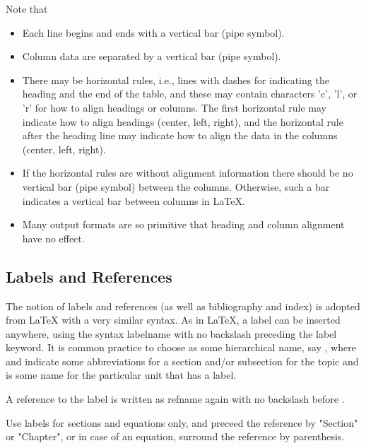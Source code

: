 \documentclass[%
oneside,                 %
final,                   %
10pt]{article}
\begin{document}
Note that

\begin{itemize}
 \item Each line begins and ends with a vertical bar (pipe symbol).

 \item Column data are separated by a vertical bar (pipe symbol).

 \item There may be horizontal rules, i.e., lines with dashes for
   indicating the heading and the end of the table, and these may
   contain characters 'c', 'l', or 'r' for how to align headings or
   columns. The first horizontal rule may indicate how to align
   headings (center, left, right), and the horizontal rule after the
   heading line may indicate how to align the data in the columns
   (center, left, right).

 \item If the horizontal rules are without alignment information there should
   be no vertical bar (pipe symbol) between the columns. Otherwise, such
   a bar indicates a vertical bar between columns in {\LaTeX}.

 \item Many output formats are so primitive that heading and column alignment
   have no effect.
\end{itemize}

\noindent
\subsection{Labels and References}

The notion of labels and references (as well as bibliography and index)
is adopted
from {\LaTeX} with a very similar syntax. As in {\LaTeX}, a label can be
inserted anywhere, using the syntax
\bccq
label{name}
\eccq
with no backslash
preceding the label keyword. It is common practice to choose 
as some hierarchical name, say , where  and  indicate
some abbreviations for a section and/or subsection for the topic and
 is some name for the particular unit that has a label.

A reference to the label  is written as
\bccq
ref{name}
\eccq
again with no backslash before .

Use labels for sections and equations only, and preceed the reference
by "Section" or "Chapter", or in case of an equation, surround the
reference by parenthesis.
\end{document}
